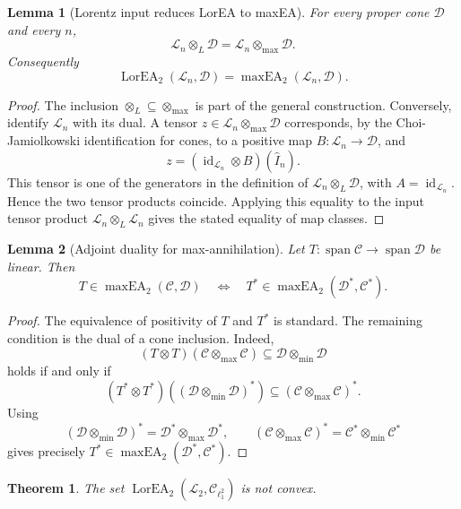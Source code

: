 \documentclass[11pt]{article}
\newtheorem{theorem}{Theorem}
\newtheorem{lemma}{Lemma}
\newcommand{\cC}{\mathcal C}
\newcommand{\cD}{\mathcal D}
\newcommand{\cL}{\mathcal L}
\newcommand{\maxEA}{\operatorname{maxEA}}
\newcommand{\LorEA}{\operatorname{LorEA}}
\newcommand{\id}{\operatorname{id}}
\begin{document}
\begin{lemma}[Lorentz input reduces LorEA to maxEA]\label{lem:lorentz-input}
For every proper cone \(\cD\) and every \(n\),
\[
\cL_n\otimes_L\cD=\cL_n\otimes_{\max}\cD.
\]
Consequently
\[
\LorEA_2(\cL_n,\cD)=\maxEA_2(\cL_n,\cD).
\]
\end{lemma}

\begin{proof}
The inclusion \(\otimes_L\subseteq\otimes_{\max}\) is part of the general
construction.  Conversely, identify \(\cL_n\) with its dual.  A tensor
\(z\in\cL_n\otimes_{\max}\cD\) corresponds, by the Choi-Jamiolkowski
identification for cones, to a positive map \(B:\cL_n\to\cD\), and
\[
z=(\id_{\cL_n}\otimes B)(\widehat I_n).
\]
This tensor is one of the generators in the definition of
\(\cL_n\otimes_L\cD\), with \(A=\id_{\cL_n}\).  Hence the two tensor products
coincide.  Applying this equality to the input tensor product
\(\cL_n\otimes_L\cL_n\) gives the stated equality of map classes.
\end{proof}

\begin{lemma}[Adjoint duality for max-annihilation]\label{lem:adjoint}
Let \(T:\operatorname{span}\cC\to\operatorname{span}\cD\) be linear.  Then
\[
T\in\maxEA_2(\cC,\cD)
\quad\Longleftrightarrow\quad
T^*\in\maxEA_2(\cD^*,\cC^*).
\]
\end{lemma}

\begin{proof}
The equivalence of positivity of \(T\) and \(T^*\) is standard.  The remaining
condition is the dual of a cone inclusion.  Indeed,
\[
(T\otimes T)(\cC\otimes_{\max}\cC)\subseteq \cD\otimes_{\min}\cD
\]
holds if and only if
\[
(T^*\otimes T^*)((\cD\otimes_{\min}\cD)^*)\subseteq
(\cC\otimes_{\max}\cC)^*.
\]
Using
\[
(\cD\otimes_{\min}\cD)^*=\cD^*\otimes_{\max}\cD^*,
\qquad
(\cC\otimes_{\max}\cC)^*=\cC^*\otimes_{\min}\cC^*
\]
gives precisely \(T^*\in\maxEA_2(\cD^*,\cC^*)\).
\end{proof}

\begin{theorem}
The set \(\LorEA_2(\cL_2,\cC_{\ell_1^2})\) is not convex.
\end{theorem}
\end{document}
